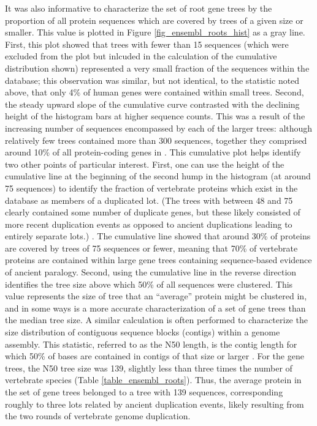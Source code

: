 It was also informative to characterize the set of root \cmp gene trees by
the proportion of all protein sequences which are covered by trees of
a given size or smaller. This value is plotted in Figure
\ref{fig_ensembl_roots_hist} as a gray line. First, this plot showed
that trees with fewer than 15 sequences (which were excluded from the
plot but inlcuded in the calculation of the cumulative distribution
shown) represented a very small fraction of the sequences within the
\cmp database; this observation was similar, but not identical, to the
statistic noted above, that only 4\% of human genes were contained
within small trees. Second, the steady upward slope of the cumulative
curve contrasted with the declining height of the histogram bars at
higher sequence counts. This was a result of the increasing number of
sequences encompassed by each of the larger trees: although relatively
few trees contained more than 300 sequences, together they comprised
around 10\% of all protein-coding genes in \cmp. This cumulative plot
helps identify two other points of particular interest. First, one can
use the height of the cumulative line at the beginning of the second
hump in the histogram (at around 75 sequences) to identify the
fraction of vertebrate proteins which exist in the \cmp database as
members of a duplicated \mammln \ac{lot}. (The trees with between 48
and 75 clearly contained some number of duplicate genes, but these
likely consisted of more recent duplication events as opposed to
ancient duplications leading to entirely separate \acp{lot}.) . The
cumulative line showed that around 30\% of proteins are covered by
trees of 75 sequences or fewer, meaning that 70\% of vertebrate
proteins are contained within large gene trees containing
sequence-based evidence of ancient paralogy. Second, using the
cumulative line in the reverse direction identifies the tree size
above which 50\% of all sequences were clustered. This value
represents the size of tree that an ``average'' protein might be
clustered in, and in some ways is a more accurate characterization of
a set of gene trees than the median tree size. A similar calculation
is often performed to characterize the size distribution of contiguous
sequence blocks (contigs) within a genome assembly. This statistic,
referred to as the N50 length, is the contig length for which 50\% of
bases are contained in contigs of that size or larger
\citep{Miller2010}. For the \cmp gene trees, the N50 tree size was
139, slightly less than three times the number of vertebrate species
(Table \ref{table_ensembl_roots}). Thus, the average protein in the
set of \cmp gene trees belonged to a tree with 139 sequences,
corresponding roughly to three \mammln \acp{lot} related by ancient
duplication events, likely resulting from the two rounds of vertebrate
genome duplication.


